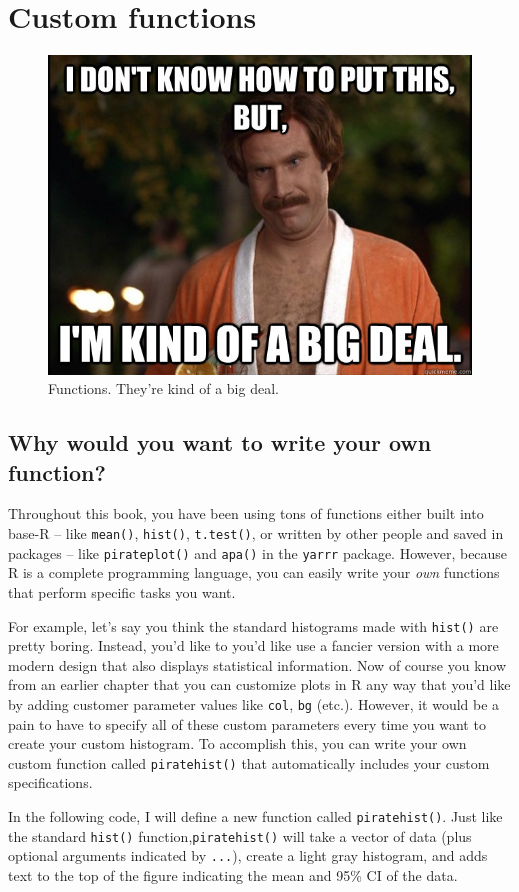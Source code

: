 \documentclass[]{book}
\theoremstyle{definition}
\theoremstyle{definition}
\theoremstyle{remark}
\begin{document}
\chapter{Custom functions}\label{functions}

\begin{figure}

{\centering \includegraphics[width=0.4\linewidth]{images/bigdeal} 

}

\caption{Functions. They're kind of a big deal.}\label{fig:unnamed-chunk-428}
\end{figure}

\section{Why would you want to write your own
function?}\label{why-would-you-want-to-write-your-own-function}

Throughout this book, you have been using tons of functions either built
into base-R -- like \texttt{mean()}, \texttt{hist()}, \texttt{t.test()},
or written by other people and saved in packages -- like
\texttt{pirateplot()} and \texttt{apa()} in the \texttt{yarrr} package.
However, because R is a complete programming language, you can easily
write your \emph{own} functions that perform specific tasks you want.

For example, let's say you think the standard histograms made with
\texttt{hist()} are pretty boring. Instead, you'd like to you'd like use
a fancier version with a more modern design that also displays
statistical information. Now of course you know from an earlier chapter
that you can customize plots in R any way that you'd like by adding
customer parameter values like \texttt{col}, \texttt{bg} (etc.).
However, it would be a pain to have to specify all of these custom
parameters every time you want to create your custom histogram. To
accomplish this, you can write your own custom function called
\texttt{piratehist()} that automatically includes your custom
specifications.

In the following code, I will define a new function called
\texttt{piratehist()}. Just like the standard \texttt{hist()}
function,\texttt{piratehist()} will take a vector of data (plus optional
arguments indicated by \texttt{...}), create a light gray histogram, and
adds text to the top of the figure indicating the mean and 95\% CI of
the data.
\end{document}
